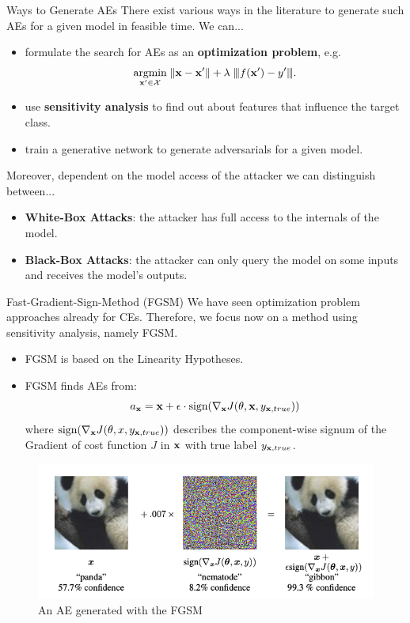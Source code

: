 \documentclass[11pt,compress,t,notes=noshow, xcolor=table]{beamer}
\begin{document}
\begin{vbframe}{Ways to Generate AEs}
There exist various ways in the literature to generate such AEs for a given model in feasible time. We can...
\begin{itemize}
    \item formulate the search for AEs as an \textbf{optimization problem}, e.g. 
    \begin{equation*}
        \label{eq:optimization}
        \underset{\xv'\in \Xspace}{\text{argmin}}\; \| \xv-\xv' \|+\lambda\;    \vertiii{f(\xv')-y'}.
    \end{equation*}
    \item use \textbf{sensitivity analysis} to find out about features that influence the target class.
    \item train a generative network to generate adversarials for a given model.
\end{itemize}
Moreover, dependent on the model access of the attacker we can distinguish between...
\begin{itemize}
    \item \textbf{White-Box Attacks}: the attacker has full access to the internals of the model.
    \item \textbf{Black-Box Attacks}: the attacker can only query the model on some inputs and receives the model's outputs.
\end{itemize}
\end{vbframe}

\begin{vbframe}{Fast-Gradient-Sign-Method (FGSM)}
We have seen optimization problem approaches already for CEs. Therefore, we focus now on a method using sensitivity analysis, namely FGSM.
\begin{itemize}
    \item FGSM is based on the Linearity Hypotheses.
    \item FGSM finds AEs from:
    \begin{equation*}
        a_{\xv}=\xv+\epsilon\cdot\text{sign}(\nabla_{\xv} J(\theta,\xv,y_{\xv,true}))
    \end{equation*}
    where $\text{sign}(\nabla_{\xv} J(\theta,x,y_{\xv,true}))$ describes the component-wise signum of the Gradient of cost function $J$ in $\xv$ with true label $y_{\xv,true}$.
\end{itemize}
\begin{figure}[h]
\centering
\includegraphics[width=0.44\linewidth]{figure/AEpanda.png}
  \caption{An AE generated with the FGSM}
  \label{fig:mnist}
\end{figure} 
\end{vbframe}
\end{document}
